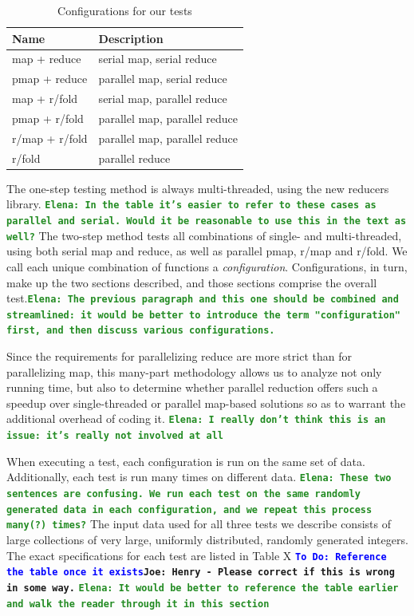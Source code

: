 \documentclass[12pt]{article}
\newcommand{\comment}[1]{{\bf \tt  {#1}}}
\newcommand{\emcomment}[1]{\textcolor{ForestGreen}{\comment{Elena: {#1}}}}
\newcommand{\joecomment}[1]{\textcolor{JoesGold}{\comment{Joe: {#1}}}}
\newcommand{\todo}[1]{\textcolor{blue}{\comment{To Do: {#1}}}}
\begin{document}
\begin{table}
\begin{center}
\begin{tabular}{|l|l|}
\hline 
Name & Description \\
\hline
map + reduce & serial map, serial reduce \\
pmap + reduce & parallel map, serial reduce \\
map + r/fold & serial map, parallel reduce \\
pmap + r/fold & parallel map, parallel reduce\\
r/map + r/fold & parallel map, parallel reduce\\
r/fold & parallel reduce\\
\hline
\end{tabular}
\end{center}
\caption{Configurations for our tests}\label{table:tests}
\end{table}

The one-step testing method is always multi-threaded, using the new reducers library. \emcomment{In the table it's easier to refer to these cases as parallel and serial. Would it be reasonable to use this in the text as well?} The two-step method tests all combinations of single- and multi-threaded, using both serial map and reduce, as well as parallel pmap, r/map and r/fold. We call each unique combination of functions a \emph{configuration}. Configurations, in turn, make up the two sections described, and those sections comprise the overall test.\emcomment{The previous paragraph and this one should be combined and streamlined: it would be better to introduce the term "configuration" first, and then discuss various configurations.}

Since the requirements for parallelizing reduce are more strict than for parallelizing map, this many-part methodology allows us to analyze not only running time, but also to determine whether parallel reduction offers such a speedup over single-threaded or parallel map-based solutions so as to warrant the additional overhead of coding it. \emcomment{I really don't think this is an issue: it's really not involved at all}

When executing a test, each configuration is run on the same set of data. Additionally, each test is run many times on different data.
\emcomment{These two sentences are confusing. We run each test on the same randomly generated data in each configuration, and we repeat this process many(?) times?} 
The input data used for all three tests we describe consists of large collections of very large, uniformly distributed, randomly generated integers. The exact specifications for each test are listed in Table X \todo{Reference the table once it exists}\joecomment{Henry - Please correct if this is wrong in some way.}
\emcomment{It would be better to reference the table earlier and walk the reader through it in this section}
\end{document}
